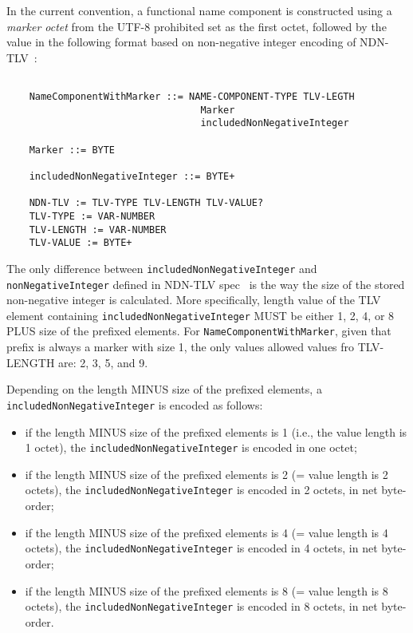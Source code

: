 In the current convention, a functional name component is constructed using a \emph{marker octet} from the UTF-8 prohibited set as the first octet, followed by the value in the following format based on non-negative integer encoding of NDN-TLV~\cite{ndn-tlv}:

\vspace{0.2cm}

\begin{minipage}[c]{0.5\textwidth}
\begin{verbatim}

    NameComponentWithMarker ::= NAME-COMPONENT-TYPE TLV-LEGTH
                                  Marker
                                  includedNonNegativeInteger

    Marker ::= BYTE

    includedNonNegativeInteger ::= BYTE+

    NDN-TLV := TLV-TYPE TLV-LENGTH TLV-VALUE?
    TLV-TYPE := VAR-NUMBER
    TLV-LENGTH := VAR-NUMBER
    TLV-VALUE := BYTE+

\end{verbatim}
\end{minipage}

The only difference between \texttt{includedNonNegativeInteger} and \texttt{nonNegativeInteger} defined in NDN-TLV spec~\cite{ndn-tlv} is the way the size of the stored non-negative integer is calculated.
More specifically, length value of the TLV element containing \texttt{includedNonNegativeInteger} MUST be either 1, 2, 4, or 8 PLUS size of the prefixed elements.
For \texttt{NameComponentWithMarker}, given that prefix is always a marker with size 1, the only values allowed values fro TLV-LENGTH are: 2, 3, 5, and 9.

Depending on the length MINUS size of the prefixed elements, a \texttt{includedNonNegativeInteger} is encoded as follows:
\begin{itemize}
\item if the length MINUS size of the prefixed elements is 1 (i.e., the value length is 1 octet), the \texttt{inclu\-dedNonNe\-ga\-ti\-veInteger} is encoded in one octet;
\item if the length MINUS size of the prefixed elements is 2 (= value length is 2 octets), the \texttt{inclu\-dedNonNe\-ga\-ti\-veInteger} is encoded in 2 octets, in net byte-order;
\item if the length MINUS size of the prefixed elements is 4 (= value length is 4 octets), the \texttt{includedNonNe\-ga\-ti\-veInteger} is encoded in 4 octets, in net byte-order;
\item if the length MINUS size of the prefixed elements is 8 (= value length is 8 octets), the \texttt{includedNonNe\-ga\-ti\-veInteger} is encoded in 8 octets, in net byte-order.
\end{itemize}

